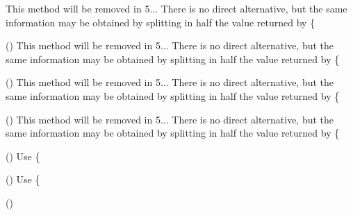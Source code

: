 \begin{DoxyRefList}
%
This method will be removed in 5... There is no direct alternative, but the same information may be obtained by splitting in half the value returned by \{ 
\item[\doxylink{report_8contract_8php_a77b973d137fb33212e018b042df6e3e7}{Global(e)} \doxylink{namespace_ramsey_1_1_uuid_a9377d7086b7368a4b421dc3f0b72a8f6}{Ramsey\+::Uuid\+::get\+Least\+Significant\+Bits\+Hex} ()]\label{deprecated__deprecated000139}%
%
This method will be removed in 5... There is no direct alternative, but the same information may be obtained by splitting in half the value returned by \{ 
\item[\doxylink{report_8contract_8php_a77b973d137fb33212e018b042df6e3e7}{Global(e)} \doxylink{namespace_ramsey_1_1_uuid_a0092bdbdf25e1daaf521df1787df0e40}{Ramsey\+::Uuid\+::get\+Most\+Significant\+Bits} ()]\label{deprecated__deprecated000140}%
%
This method will be removed in 5... There is no direct alternative, but the same information may be obtained by splitting in half the value returned by \{ 
\item[\doxylink{report_8contract_8php_a77b973d137fb33212e018b042df6e3e7}{Global(e)} \doxylink{namespace_ramsey_1_1_uuid_a5b313cc7e08a0010445eee725a978284}{Ramsey\+::Uuid\+::get\+Most\+Significant\+Bits\+Hex} ()]\label{deprecated__deprecated000141}%
%
This method will be removed in 5... There is no direct alternative, but the same information may be obtained by splitting in half the value returned by \{ 
\item[\doxylink{report_8contract_8php_a77b973d137fb33212e018b042df6e3e7}{Global(e)} \doxylink{namespace_ramsey_1_1_uuid_a3a0d17930cbcc57bef84064afcc1a837}{Ramsey\+::Uuid\+::get\+Node} ()]\label{deprecated__deprecated000142}%
%
Use \{ 
\item[\doxylink{report_8contract_8php_a77b973d137fb33212e018b042df6e3e7}{Global(e)} \doxylink{namespace_ramsey_1_1_uuid_a668b7447a6808eca31ab2d2281d11407}{Ramsey\+::Uuid\+::get\+Node\+Hex} ()]\label{deprecated__deprecated000143}%
%
Use \{ 
\item[\doxylink{report_8contract_8php_a77b973d137fb33212e018b042df6e3e7}{Global(e)} \doxylink{namespace_ramsey_1_1_uuid_ab9e4dd24ec789a7e2b54a34edf098d2d}{Ramsey\+::Uuid\+::get\+Number\+Converter} ()]\label{deprecated__deprecated000135}%

\end{DoxyRefList}
